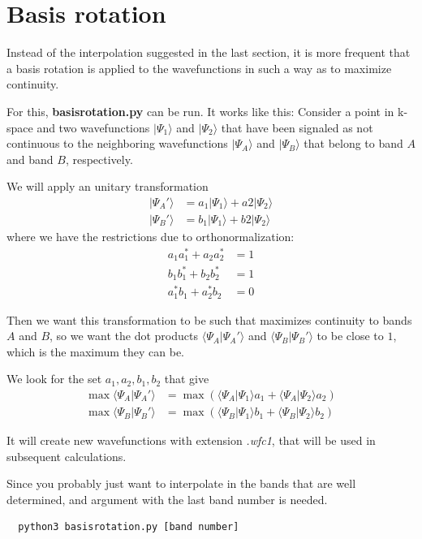\documentclass[a4paper,12pt]{report}
\begin{document}
\section{Basis rotation}
 Instead of the interpolation suggested in the last section, it is more frequent that a basis rotation
 is applied to the wavefunctions in such a way as to maximize continuity.

 For this, \textbf{basisrotation.py} can be run.
 It works like this:
 Consider a point in k-space and two wavefunctions $|\Psi_1\rangle$ and $|\Psi_2\rangle$
 that have been signaled as not continuous to the neighboring wavefunctions $|\Psi_A\rangle$ and $|\Psi_B\rangle$
 that belong to band $A$ and band $B$, respectively.

 We will apply an unitary transformation
 \begin{align*}
  |\Psi_A'\rangle &= a_1|\Psi_1\rangle + a2|\Psi_2\rangle \\
  |\Psi_B'\rangle &= b_1|\Psi_1\rangle + b2|\Psi_2\rangle
 \end{align*}
 where we have the restrictions due to orthonormalization:
 \begin{align*}
  a_1a_1^* + a_2a_2^* &= 1\\
  b_1b_1^* + b_2b_2^* &= 1\\
  a_1^*b_1 + a_2^*b_2 &= 0
 \end{align*}

 Then we want this transformation to be such that maximizes continuity to bands $A$ and $B$, so we want
 the dot products $\langle \Psi_A|\Psi_A'\rangle $ and $\langle \Psi_B|\Psi_B'\rangle $ to be close to $1$,
 which is the maximum they can be.

 We look for the set $a_1, a_2, b_1, b_2$ that give
 \begin{align*}
  \max \langle \Psi_A|\Psi_A'\rangle &= \max \left( \langle \Psi_A|\Psi_1\rangle a_1 + \langle \Psi_A|\Psi_2\rangle a_2\right) \\
  \max \langle \Psi_B|\Psi_B'\rangle &= \max \left( \langle \Psi_B|\Psi_1\rangle b_1 + \langle \Psi_B|\Psi_2\rangle b_2\right)
 \end{align*}



 It will create new wavefunctions with extension \emph{.wfc1}, that will be used in subsequent calculations.

 Since you probably just want to interpolate in the bands that are well determined, and argument with the last band number
 is needed.
 \begin{verbatim}
  python3 basisrotation.py [band number]
 \end{verbatim}
\end{document}
